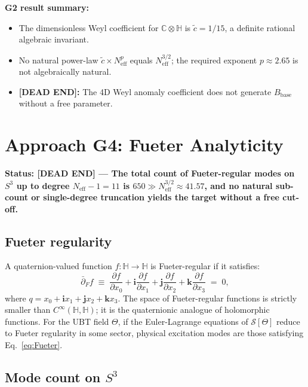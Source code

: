 \documentclass[11pt,a4paper]{article}
\theoremstyle{definition}
\theoremstyle{remark}
\begin{document}
\textbf{G2 result summary:}
\begin{itemize}
  \item The dimensionless Weyl coefficient for $\mathbb{C}\otimes\mathbb{H}$
    is $\tilde{c} = 1/15$, a definite rational algebraic invariant.
  \item No natural power-law $\tilde{c} \times N_{\mathrm{eff}}^p$ equals
    $N_{\mathrm{eff}}^{3/2}$; the required exponent $p \approx 2.65$
    is not algebraically natural.
  \item \textbf{[DEAD END]:} The 4D Weyl anomaly coefficient does not
    generate $B_{\mathrm{base}}$ without a free parameter.
\end{itemize}

\section{Approach G4: Fueter Analyticity}
\label{sec:G4}

\textbf{Status: [DEAD END] — The total count of Fueter-regular modes on
$S^3$ up to degree $N_{\mathrm{eff}} - 1 = 11$ is $650 \gg N_{\mathrm{eff}}^{3/2}
\approx 41.57$, and no natural sub-count or single-degree truncation yields
the target without a free cut-off.}

\subsection{Fueter regularity}

A quaternion-valued function $f : \mathbb{H} \to \mathbb{H}$ is
Fueter-regular if it satisfies:
\begin{equation}
  \bar{\partial}_F f
  \;\equiv\;
  \frac{\partial f}{\partial x_0}
  + \mathbf{i}\frac{\partial f}{\partial x_1}
  + \mathbf{j}\frac{\partial f}{\partial x_2}
  + \mathbf{k}\frac{\partial f}{\partial x_3}
  \;=\; 0,
  \label{eq:Fueter}
\end{equation}
where $q = x_0 + \mathbf{i}x_1 + \mathbf{j}x_2 + \mathbf{k}x_3$.
The space of Fueter-regular functions is strictly smaller than
$C^\infty(\mathbb{H}, \mathbb{H})$; it is the quaternionic analogue of
holomorphic functions.
For the UBT field $\Theta$, if the Euler-Lagrange equations of
$\mathcal{S}[\Theta]$ reduce to Fueter regularity in some sector,
physical excitation modes are those satisfying Eq.~\eqref{eq:Fueter}.

\subsection{Mode count on $S^3$}
\end{document}
